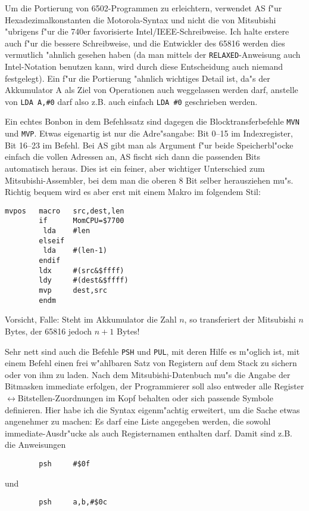 \documentclass[12pt,a4paper,twoside]{report}
\newcommand{\tty}[1]{{\tt #1}}
\begin{document}
Um die Portierung von 6502-Programmen zu erleichtern, verwendet AS f"ur
Hexadezimalkonstanten die Motorola-Syntax und nicht die von Mitsubishi
"ubrigens f"ur die 740er favorisierte Intel/IEEE-Schreibweise.
Ich halte erstere auch f"ur die bessere Schreibweise, und die Entwickler
des 65816 werden dies vermutlich "ahnlich gesehen haben (da man mittels
der \tty{RELAXED}-Anweisung auch Intel-Notation benutzen kann, wird durch
diese Entscheidung auch niemand festgelegt).  Ein f"ur die
Portierung "ahnlich wichtiges Detail ist, da"s der Akkumulator A als
Ziel von Operationen auch weggelassen werden darf, anstelle von
\tty{LDA A,\#0} darf also z.B. auch einfach \tty{LDA \#0} geschrieben
werden.
\par
Ein echtes Bonbon in dem Befehlssatz sind dagegen die Blocktransferbefehle
\tty{MVN} und \tty{MVP}.  Etwas eigenartig ist nur die Adre"sangabe:
Bit 0--15 im Indexregister, Bit 16--23 im Befehl.  Bei AS gibt  man als
Argument f"ur beide Speicherbl"ocke einfach die vollen Adressen an, AS
fischt sich dann die passenden Bits automatisch heraus.  Dies ist ein
feiner, aber wichtiger Unterschied zum Mitsubishi-Assembler, bei dem
man die oberen 8 Bit selber herausziehen mu"s.  Richtig bequem
wird es aber erst mit einem Makro im folgendem Stil:
\begin{verbatim}
mvpos   macro   src,dest,len
        if      MomCPU=$7700
         lda    #len
        elseif
         lda    #(len-1)
        endif
        ldx     #(src&$ffff)
        ldy     #(dest&$ffff)
        mvp     dest,src
        endm
\end{verbatim}
Vorsicht, Falle: Steht im Akkumulator die Zahl $n$, so transferiert
der Mitsubishi $n$ Bytes, der 65816 jedoch $n+1$ Bytes!
\par
Sehr nett sind auch die Befehle \tty{PSH} und \tty{PUL}, mit deren Hilfe es
m"oglich ist, mit einem Befehl einen frei w"ahlbaren Satz von Registern
auf dem Stack zu sichern oder von ihm zu laden.  Nach dem
Mitsubishi-Datenbuch\cite{Mit16} mu"s die Angabe der Bitmasken immediate
erfolgen, der Programmierer soll also entweder alle
Register$\leftrightarrow$Bitstellen-Zuordnungen im Kopf behalten oder
sich passende Symbole definieren.  Hier habe ich die Syntax eigenm"achtig
erweitert, um die Sache etwas angenehmer zu machen: Es darf eine Liste
angegeben werden, die sowohl immediate-Ausdr"ucke als auch Registernamen
enthalten darf.  Damit sind z.B. die Anweisungen
\begin{verbatim}
        psh     #$0f
\end{verbatim}
und
\begin{verbatim}
        psh     a,b,#$0c
\end{verbatim}
\end{document}
